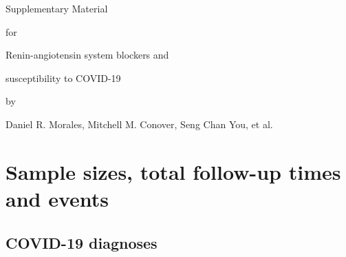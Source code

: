\documentclass[11pt,]{article}
\author{}
\date{\vspace{-2.5em}}
\begin{document}
\centerline{{\Huge Supplementary Material}}
\vspace{1.0em}
\centerline{\Large for}
\vspace{1.0em}
\centerline{\huge Renin-angiotensin system blockers and}
\centerline{\huge susceptibility to COVID-19}
\vspace{1.0em}
\centerline{\Large by}
\vspace{1.0em}
\centerline{\Large Daniel R. Morales, Mitchell M. Conover, Seng Chan You, et al.}

\tableofcontents

\captionsetup[table]{name=Supplementary Table}
\captionsetup[figure]{name=Supplementary Figure}
\captionsetup{labelfont=bf}

\renewcommand\theContinuedFloat{\alph{ContinuedFloat}}

\clearpage

\hypertarget{sample-sizes-total-follow-up-times-and-events}{%
\section{Sample sizes, total follow-up times and
events}\label{sample-sizes-total-follow-up-times-and-events}}

\hypertarget{covid-19-diagnoses}{%
\subsection{COVID-19 diagnoses}\label{covid-19-diagnoses}}
\end{document}
